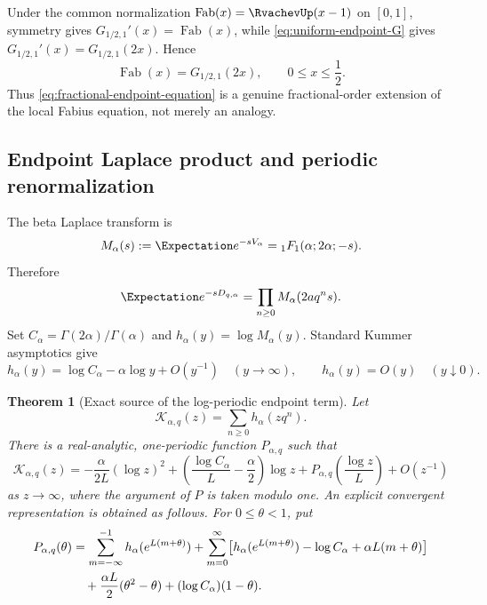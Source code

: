 \documentclass[11pt]{article}
\newtheorem{theorem}{Theorem}[section]
\theoremstyle{definition}
\theoremstyle{remark}
\newcommand{\Fab}{\operatorname{Fab}}
\newcommand{\Kcal}{\mathcal{K}}
\begin{document}
Under the common normalization
\(\Fab(x)=\RvachevUp(x-1)\) on \([0,1]\), symmetry gives
\(G_{1/2,1}'(x)=\Fab(x)\), while \eqref{eq:uniform-endpoint-G} gives
\(G_{1/2,1}'(x)=G_{1/2,1}(2x)\).  Hence
\begin{equation}
 \Fab(x)=G_{1/2,1}(2x),\qquad 0\le x\le\frac12.
 \label{eq:Fabius-G-relation}
\end{equation}
Thus \eqref{eq:fractional-endpoint-equation} is a genuine fractional-order
extension of the local Fabius equation, not merely an analogy.

\subsection{Endpoint Laplace product and periodic renormalization}

The beta Laplace transform is
\begin{equation}
 M_\alpha(s):=\Expectation e^{-sV_\alpha}
 ={}_1F_1(\alpha;2\alpha;-s).
 \label{eq:beta-laplace}
\end{equation}
Therefore
\begin{equation}
 \Expectation e^{-sD_{q,\alpha}}
 =\prod_{n\ge0}M_\alpha(2aq^ns).
 \label{eq:endpoint-laplace-product}
\end{equation}
Set \(C_\alpha=\Gamma(2\alpha)/\Gamma(\alpha)\) and
\(h_\alpha(y)=\log M_\alpha(y)\).  Standard Kummer asymptotics \cite{DLMF} give
\begin{equation}
 h_\alpha(y)=\log C_\alpha-\alpha\log y+O(y^{-1})
 \quad(y\to\infty),
 \qquad
 h_\alpha(y)=O(y)\quad(y\downarrow0).
 \label{eq:h-asymptotics}
\end{equation}

\begin{theorem}[Exact source of the log-periodic endpoint term]
\label{thm:laplace-periodicity}
Let
\[
 \Kcal_{\alpha,q}(z)=\sum_{n\ge0}h_\alpha(zq^n).
\]
There is a real-analytic, one-periodic function \(P_{\alpha,q}\) such that
\begin{equation}
 \Kcal_{\alpha,q}(z)
 =-\frac{\alpha}{2L}(\log z)^2
 +\left(\frac{\log C_\alpha}{L}-\frac\alpha2\right)\log z
 +P_{\alpha,q}\left(\frac{\log z}{L}\right)
 +O(z^{-1})
 \label{eq:laplace-periodic-asymptotic}
\end{equation}
as \(z\to\infty\), where the argument of \(P\) is taken modulo one.
An explicit convergent representation is obtained as follows.  For
\(0\le\theta<1\), put
\begin{align}
 P_{\alpha,q}(\theta)
 &=\sum_{m=-\infty}^{-1}h_\alpha(e^{L(m+\theta)})
 +\sum_{m=0}^{\infty}
 \bigl[h_\alpha(e^{L(m+\theta)})-\log C_\alpha
      +\alpha L(m+\theta)\bigr]
 \notag\\
 &\quad+\frac{\alpha L}{2}(\theta^2-\theta)
 +(\log C_\alpha)(1-\theta).
 \label{eq:periodic-profile-series}
\end{align}
\end{theorem}
\end{document}
